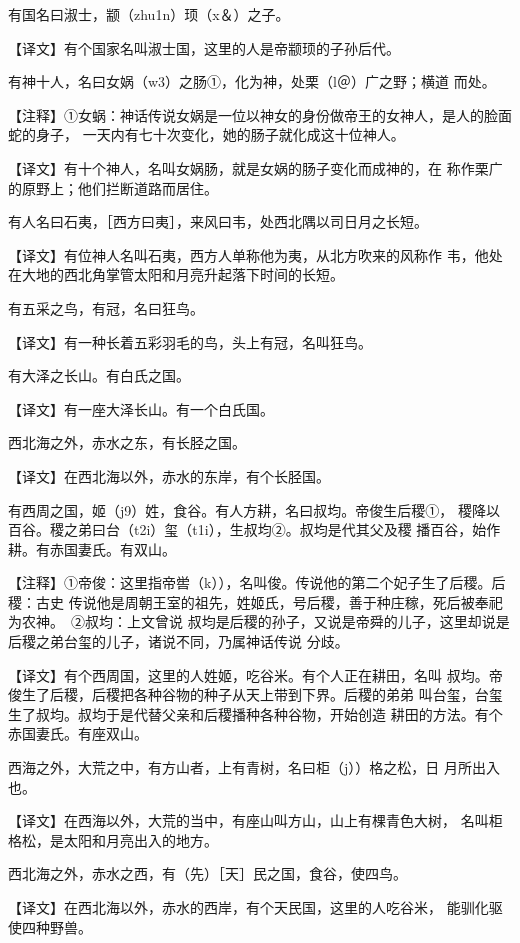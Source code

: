 \documentclass[a4paper,12pt,UTF8,twoside]{ctexbook}
\begin{document}
有国名曰淑士，颛（zhu1n）顼（x＆）之子。

【译文】有个国家名叫淑士国，这里的人是帝颛顼的子孙后代。

有神十人，名曰女娲（w3）之肠①，化为神，处栗（l＠）广之野；横道 而处。

【注释】①女蜗：神话传说女娲是一位以神女的身份做帝王的女神人，是人的脸面蛇的身子， 一天内有七十次变化，她的肠子就化成这十位神人。

【译文】有十个神人，名叫女娲肠，就是女娲的肠子变化而成神的，在 称作栗广的原野上；他们拦断道路而居住。

有人名曰石夷，［西方曰夷］，来风曰韦，处西北隅以司日月之长短。

【译文】有位神人名叫石夷，西方人单称他为夷，从北方吹来的风称作 韦，他处在大地的西北角掌管太阳和月亮升起落下时间的长短。

有五采之鸟，有冠，名曰狂鸟。

【译文】有一种长着五彩羽毛的鸟，头上有冠，名叫狂鸟。

有大泽之长山。有白氏之国。

【译文】有一座大泽长山。有一个白氏国。

西北海之外，赤水之东，有长胫之国。

【译文】在西北海以外，赤水的东岸，有个长胫国。

有西周之国，姬（j9）姓，食谷。有人方耕，名曰叔均。帝俊生后稷①， 稷降以百谷。稷之弟曰台（t2i）玺（t1i），生叔均②。叔均是代其父及稷 播百谷，始作耕。有赤国妻氏。有双山。

【注释】①帝俊：这里指帝喾（k）），名叫俊。传说他的第二个妃子生了后稷。后稷：古史 传说他是周朝王室的祖先，姓姬氏，号后稷，善于种庄稼，死后被奉祀为农神。　②叔均：上文曾说 叔均是后稷的孙子，又说是帝舜的儿子，这里却说是后稷之弟台玺的儿子，诸说不同，乃属神话传说 分歧。

【译文】有个西周国，这里的人姓姬，吃谷米。有个人正在耕田，名叫 叔均。帝俊生了后稷，后稷把各种谷物的种子从天上带到下界。后稷的弟弟 叫台玺，台玺生了叔均。叔均于是代替父亲和后稷播种各种谷物，开始创造 耕田的方法。有个赤国妻氏。有座双山。

西海之外，大荒之中，有方山者，上有青树，名曰柜（j））格之松，日 月所出入也。

【译文】在西海以外，大荒的当中，有座山叫方山，山上有棵青色大树， 名叫柜格松，是太阳和月亮出入的地方。

西北海之外，赤水之西，有（先）［天］民之国，食谷，使四鸟。

【译文】在西北海以外，赤水的西岸，有个天民国，这里的人吃谷米， 能驯化驱使四种野兽。
\end{document}
